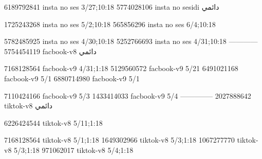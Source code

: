 
6189792841 insta no ses
3/27;10:18
5774028106 insta no sesidi
دائمي


1725243268 insta no ses
5/2;10:18
565856296 insta no ses
6/4;10:18

5782485925 insta no ses
4/30;10:18
5252766693 insta no ses
4/31;10:18
------------
5754454119 facbook-v8
دائمي

7168128564 facbook-v9
4/31;1:18
5129560572 facbook-v9
5/21
6491021168 facbook-v9
5/1
6880714980 facbook-v9
5/1

7110424166 facbook-v9
5/3
1433414033 facbook-v9
5/4
--------------
2027888642 tiktok-v8
دائمي

6226424544 tiktok-v8
5/11;1:18

7168128564 tiktok-v8
5/1;1:18
1649302966 tiktok-v8
5/3;1:18
1067277770 tiktok-v8
5/3;1:18
971062017 tiktok-v8
5/4;1:18
